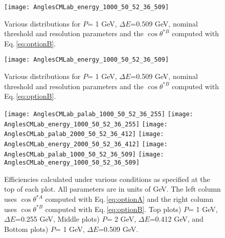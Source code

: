 \documentclass[12pt]{article}
\begin{document}
\begin{figure}[tbph]
\begin{center}
\texttt{[image: AnglesCMLab\_energy\_1000\_50\_52\_36\_509]}
\caption{Various distributions for $P$= 1 GeV, $\Delta E$=0.509 GeV, nominal threshold and resolution parameters and the $\cos{\theta^{*B}}$ computed with Eq.\,\ref{eq:optionB}.
\label{fig:AnglesCMLab_energy_1000_50_52_36_509_p2}}
\end{center}
\end{figure}

\begin{figure}[tbph]
\begin{center}
\texttt{[image: AnglesCMLab\_energy\_1000\_50\_52\_36\_509]}
\caption{Various distributions for $P$= 1 GeV, $\Delta E$=0.509 GeV, nominal threshold and resolution parameters and the $\cos{\theta^{*B}}$ computed with Eq.\,\ref{eq:optionB}.
\label{fig:AnglesCMLab_energy_1000_50_52_36_509_p3}}
\end{center}
\end{figure}


\begin{figure}[tbph]
\begin{center}
\texttt{[image: AnglesCMLab\_palab\_1000\_50\_52\_36\_255]}
\texttt{[image: AnglesCMLab\_energy\_1000\_50\_52\_36\_255]}
\texttt{[image: AnglesCMLab\_palab\_2000\_50\_52\_36\_412]}
\texttt{[image: AnglesCMLab\_energy\_2000\_50\_52\_36\_412]}
\texttt{[image: AnglesCMLab\_palab\_1000\_50\_52\_36\_509]}
\texttt{[image: AnglesCMLab\_energy\_1000\_50\_52\_36\_509]}
\caption{Efficiencies calculated under various conditions as specified at the top of each plot. All parameters are in units of GeV. The left column uses $\cos{\theta^{*A}}$ computed with Eq.\,\ref{eq:optionA} 
and the right column uses  $\cos{\theta^{*B}}$ computed with Eq.\,\ref{eq:optionB}. Top plots) $P$= 1 GeV, $\Delta E$=0.255 GeV, Middle plots) $P$= 2 GeV, $\Delta E$=0.412 GeV, and
Bottom plots) $P$= 1 GeV, $\Delta E$=0.509 GeV.
\label{fig:AnglesCMLab_p4}}
\end{center}
\end{figure}  
\end{document}
